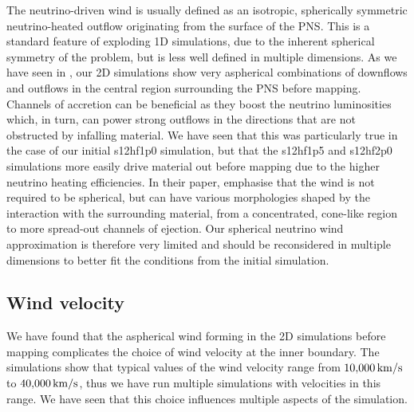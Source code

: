 The neutrino-driven wind is usually defined as an isotropic, spherically symmetric neutrino-heated outflow originating from the surface of the PNS. This is a standard feature of exploding 1D simulations, due to the inherent spherical symmetry of the problem, but is less well defined in multiple dimensions. As we have seen in , our 2D simulations show very aspherical combinations of downflows and outflows in the central region surrounding the PNS before mapping. Channels of accretion can be beneficial as they boost the neutrino luminosities which, in turn, can power strong outflows in the directions that are not obstructed by infalling material. We have seen that this was particularly true in the case of our initial s12hf1p0 simulation, but that the s12hf1p5 and s12hf2p0 simulations more easily drive material out before mapping due to the higher neutrino heating efficiencies. In their paper, \cite{Wang2023} emphasise that the wind is not required to be spherical, but can have various morphologies shaped by the interaction with the surrounding material, from a concentrated, cone-like region to more spread-out channels of ejection. Our spherical neutrino wind approximation is therefore very limited and should be reconsidered in multiple dimensions to better fit the conditions from the initial simulation.

\subsection{Wind velocity}

We have found that the aspherical wind forming in the 2D simulations before mapping complicates the choice of wind velocity at the inner boundary. The simulations show that typical values of the wind velocity range from \(10{,}000\,\mathrm{km/s}\) to \(40{,}000\,\mathrm{km/s}\), thus we have run multiple simulations with velocities in this range. We have seen that this choice influences multiple aspects of the simulation.

